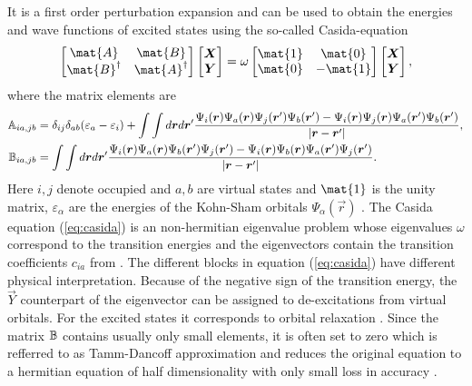 It is a first order perturbation expansion and can be used to obtain the energies and wave functions of excited states using the so-called Casida-equation \cite{casida}
\begin{equation} \label{eq:casida}
\begin{bmatrix} \mat{A} & \mat{B} \\ \mat{B}^\dagger & \mat{A}^\dagger\end{bmatrix}
\begin{bmatrix} \vec{X} \\ \vec{Y} \end{bmatrix} =
\omega \begin{bmatrix} \mat{1} & \mat{0} \\ \mat{0} & -\mat{1}\end{bmatrix}
\begin{bmatrix} \vec{X} \\ \vec{Y} \end{bmatrix},
\end{equation}
where the matrix elements are
\begin{align}
\mathbb{A}_{ia,jb}& =\delta_{ij}\delta_{ab}(\varepsilon_a-\varepsilon_i)+ 
\int \int d\bm{r} d\bm{r}'\frac{ \Psi_i(\bm{r}) \Psi_a(\bm{r})  \Psi_j(\bm{r}') \Psi_b(\bm{r}')- 
\Psi_i(\bm{r}) \Psi_j(\bm{r}) \Psi_a(\bm{r}') \Psi_b(\bm{r}')}{|\bm{r}-\bm{r}'|} ,\\
\mathbb{B}_{ia,jb}& = \int \int d\bm{r} d\bm{r}'\frac{\Psi_i(\bm{r}) \Psi_a(\bm{r})  \Psi_b(\bm{r}') \Psi_j(\bm{r}')- 
\Psi_i(\bm{r}) \Psi_b(\bm{r})  \Psi_a(\bm{r}') \Psi_j(\bm{r}')}{|\bm{r}-\bm{r}'|}.
\end{align}
Here $i,j$ denote occupied and $a,b$ are virtual states and $\mat{1}$ is the unity matrix, $\varepsilon_\alpha$ are the energies of the Kohn-Sham orbitals $\Psi_\alpha(\vec{r})$ \cite{dreuw}.
The Casida equation (\ref{eq:casida}) is an non-hermitian eigenvalue problem whose eigenvalues $\omega$ correspond to the transition energies and the eigenvectors contain the transition coefficients $c_{ia}$ from .
The different blocks in equation (\ref{eq:casida}) have different physical interpretation.
Because of the negative sign of the transition energy, the $\vec{Y}$ counterpart of the eigenvector can be assigned to de-excitations from virtual orbitals.
For the excited states it corresponds to orbital relaxation \cite{dreuw}.
Since the matrix $\mathbb{B}$ contains usually only small elements, it is often set to zero which is refferred to as Tamm-Dancoff approximation and reduces the original equation to a hermitian equation of half dimensionality with only small loss in accuracy \cite{casida}.

